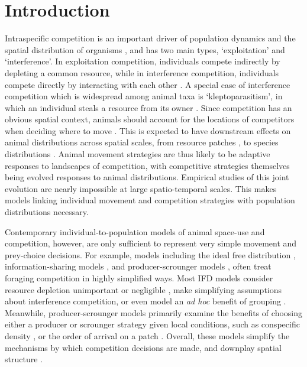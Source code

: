 
\section*{Introduction}
Intraspecific competition is an important driver of population dynamics and the spatial distribution of organisms \citep{krebs1978}, and has two main types, `exploitation' and `interference'.
In exploitation competition, individuals compete indirectly by depleting a common resource, while in interference competition, individuals compete directly by interacting with each other \citep{birch1957,case1974,keddy2001}.
A special case of interference competition which is widespread among animal taxa is `kleptoparasitism', in which an individual steals a resource from its owner \citep{iyengar2008}.
Since competition has an obvious spatial context, animals should account for the locations of competitors when deciding where to move \citep{nathan2008a}.
This is expected to have downstream effects on animal distributions across spatial scales, from resource patches \citep{fretwell1970}, to species distributions \citep{duckworth2007,schlagel2020}.
Animal movement strategies are thus likely to be adaptive responses to landscapes of competition, with competitive strategies themselves being evolved responses to animal distributions.
Empirical studies of this joint evolution are nearly impossible at large spatio-temporal scales.
This makes models linking individual movement and competition strategies with population distributions necessary.

Contemporary individual-to-population models of animal space-use \citep[reviewed in][]{deangelis2019} and competition, however, are only sufficient to represent very simple movement and prey-choice decisions.
For example, models including the ideal free distribution \citep[IFD;][]{fretwell1970}, information-sharing models \citep[][]{giraldeau1999,folmer2012}, and producer-scrounger models \citep[][]{barnard1981,vickery1991,beauchamp2008}, often treat foraging competition in highly simplified ways.
Most IFD models consider resource depletion unimportant or negligible \citep[continuous input models, see][]{tregenza1995, vandermeer1997}, make simplifying assumptions about interference competition, or even model an \textit{ad hoc} benefit of grouping \citep[e.g.][]{amano2006b}.
Meanwhile, producer-scrounger models primarily examine the benefits of choosing either a producer or scrounger strategy given local conditions, such as conspecific density \citep{vickery1991}, or the order of arrival on a patch \citep{beauchamp2008}.
Overall, these models simplify the mechanisms by which competition decisions are made, and downplay spatial structure \citep[see also][]{holmgren1995, garay2020, spencer2018}.

